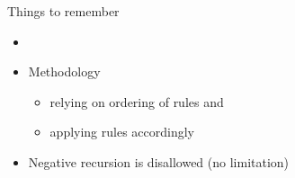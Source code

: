 \begin{frame}{Things to remember}
  \bigskip
  \begin{itemize}
  \item {}
    \medskip
  \item Methodology
    \begin{itemize}\normalsize
    \item relying on ordering of rules and
    \item applying rules accordingly
    \end{itemize}
    \bigskip
  \item Negative recursion is disallowed (no limitation)
  \end{itemize}
\end{frame}
%
